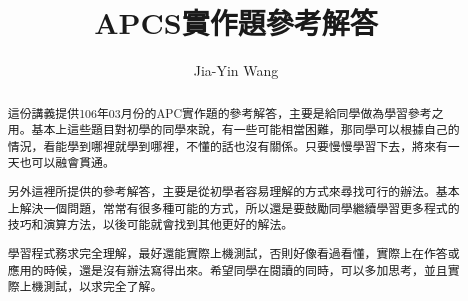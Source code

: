 \documentclass[12pt,a4paper]{article}
\begin{document}
\title{APCS實作題參考解答}
\author{Jia-Yin Wang}
\maketitle

\begin{abstract}
這份講義提供106年03月份的APC實作題的參考解答，主要是給同學做為學習參考之用。基本上這些題目對初學的同學來說，有一些可能相當困難，那同學可以根據自己的情況，看能學到哪裡就學到哪裡，不懂的話也沒有關係。只要慢慢學習下去，將來有一天也可以融會貫通。

另外這裡所提供的參考解答，主要是從初學者容易理解的方式來尋找可行的辦法。基本上解決一個問題，常常有很多種可能的方式，所以還是要鼓勵同學繼續學習更多程式的技巧和演算方法，以後可能就會找到其他更好的解法。

學習程式務求完全理解，最好還能實際上機測試，否則好像看過看懂，實際上在作答或應用的時候，還是沒有辦法寫得出來。希望同學在閱讀的同時，可以多加思考，並且實際上機測試，以求完全了解。
\end{abstract}
%
%


\newpage

\newpage

\newpage

\end{document}
